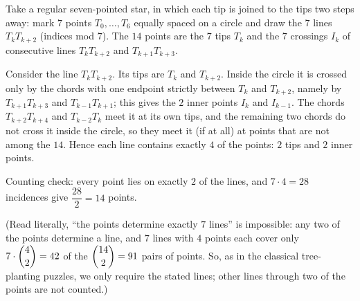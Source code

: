 Take a regular seven-pointed star, in which each tip is joined to the tips two steps away: mark $7$ points $T_0,\dots,T_6$ equally spaced on a circle and draw the $7$ lines $T_kT_{k+2}$ (indices mod $7$). The $14$ points are the $7$ tips $T_k$ and the $7$ crossings $I_k$ of consecutive lines $T_kT_{k+2}$ and $T_{k+1}T_{k+3}$.


Consider the line $T_kT_{k+2}$. Its tips are $T_k$ and $T_{k+2}$. Inside the circle it is crossed only by the chords with one endpoint strictly between $T_k$ and $T_{k+2}$, namely by $T_{k+1}T_{k+3}$ and $T_{k-1}T_{k+1}$; this gives the $2$ inner points $I_k$ and $I_{k-1}$. The chords $T_{k+2}T_{k+4}$ and $T_{k-2}T_k$ meet it at its own tips, and the remaining two chords do not cross it inside the circle, so they meet it (if at all) at points that are not among the $14$. Hence each line contains exactly $4$ of the points: $2$ tips and $2$ inner points.

Counting check: every point lies on exactly $2$ of the lines, and $7\cdot4=28$ incidences give $\dfrac{28}{2}=14$ points.

(Read literally, ``the points determine exactly $7$ lines'' is impossible: any two of the points determine a line, and $7$ lines with $4$ points each cover only $7\cdot\dbinom{4}{2}=42$ of the $\dbinom{14}{2}=91$ pairs of points. So, as in the classical tree-planting puzzles, we only require the stated lines; other lines through two of the points are not counted.)
